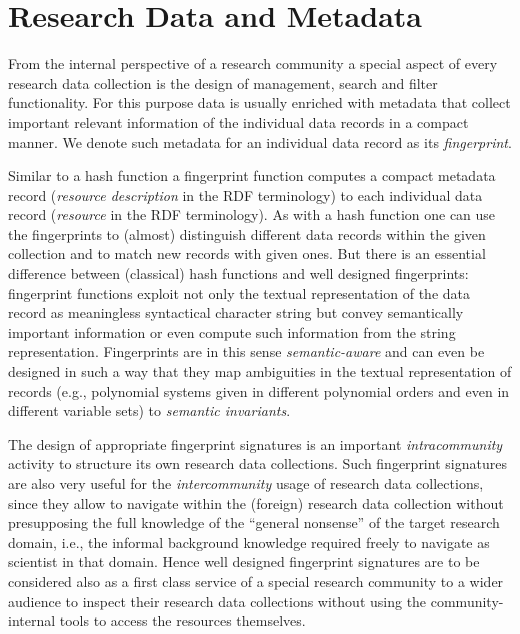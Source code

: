 \documentclass[runningheads,a4paper]{llncs}
\begin{document}
\section{Research Data and Metadata}

From the internal perspective of a research community a special aspect of every
research data collection is the design of management, search and filter
functionality.  For this purpose data is usually enriched with metadata that
collect important relevant information of the individual data records in a
compact manner.  We denote such metadata for an individual data record as its
\emph{fingerprint}.

Similar to a hash function a fingerprint function computes a compact metadata
record (\emph{resource description} in the RDF terminology) to each individual
data record (\emph{resource} in the RDF terminology).  As with a hash function
one can use the fingerprints to (almost) distinguish different data records
within the given collection and to match new records with given ones. But there
is an essential difference between (classical) hash functions and well designed
fingerprints: fingerprint functions exploit not only the textual representation
of the data record as meaningless syntactical character string but convey
semantically important information or even compute such information from the
string representation.  Fingerprints are in this sense \emph{semantic-aware}
and can even be designed in such a way that they map ambiguities in the textual
representation of records (e.g., polynomial systems given in different
polynomial orders and even in different variable sets) to \emph{semantic
  invariants}.

The design of appropriate fingerprint signatures is an important
\emph{intracommunity} activity to structure its own research data collections.
Such fingerprint signatures are also very useful for the \emph{intercommunity}
usage of research data collections, since they allow to navigate within the
(foreign) research data collection without presupposing the full knowledge of
the ``general nonsense'' of the target research domain, i.e., the informal
background knowledge required freely to navigate as scientist in that domain.
Hence well designed fingerprint signatures are to be considered also as a first
class service of a special research community to a wider audience to inspect
their research data collections without using the community-internal tools to
access the resources themselves.
\end{document}
